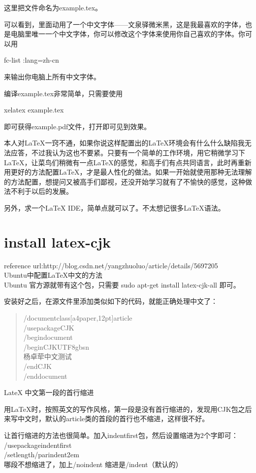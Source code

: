 \documentclass{article}
\begin{document}
这里把文件命名为example.tex。

可以看到，里面动用了一个中文字体——文泉驿微米黑，这是我最喜欢的字体，也是电脑里唯一一个中文字体，你可以修改这个字体来使用你自己喜欢的字体。你可以用
    
fc-list :lang=zh-cn

来输出你电脑上所有中文字体。

编译example.tex非常简单，只需要使用
    
xelatex example.tex

即可获得example.pdf文件，打开即可见到效果。

本人对LaTeX一窍不通，如果你说这样配置出的LaTeX环境会有什么什么缺陷我无法应答，不过我认为这也不要紧。只要有一个简单的工作环境，用它稍微学习下LaTeX，让菜鸟们稍微有一点LaTeX的感觉，和高手们有点共同语言，此时再重新用更好的方法配置LaTeX，才是最人性化的做法。如果一开始就使用那种无法理解的方法配置，想提问又被高手们鄙视，还没开始学习就有了不愉快的感觉，这种做法不利于以后的发展。

另外，求一个LaTeX IDE，简单点就可以了。不太想记很多LaTeX语法。

\section{install latex-cjk}
reference url:http://blog.csdn.net/yangzhuoluo/article/details/5697205\\
Ubuntu中配置LaTeX中文的方法\\

Ubuntu 官方源就带有这个包，只需要 sudo apt-get install latex-cjk-all 即可。

安装好之后，在源文件里添加类似如下的代码，就能正确处理中文了：

 
\begin{quotation}
/documentclass[a4paper,12pt]{article}\\
/usepackage{CJK}\\
/begin{document}\\
/begin{CJK}{UTF8}{gbsn}\\
杨卓荦中文测试\\
/end{CJK}\\
/end{document}\\
\end{quotation}
LateX 中文第一段的首行缩进

用LaTeX时，按照英文的写作风格，第一段是没有首行缩进的，发现用CJK包之后来写中文时，默认的article类的首段的首行也不缩进，这样很不好。

让首行缩进的方法也很简单。加入indentfirst包，然后设置缩进为2个字即可：
/usepackage{indentfirst}\\
/setlength{/parindent}{2em}\\
哪段不想缩进了，加上/noindent 缩进是/indent（默认的）
\end{document}
